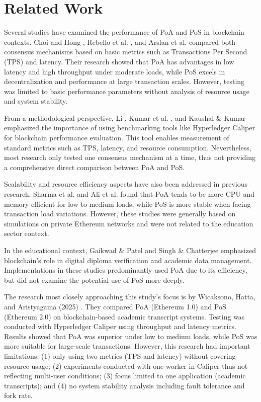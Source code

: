 \documentclass[conference]{IEEEtran}
\begin{document}
\section{Related Work}

Several studies have examined the performance of PoA and PoS in blockchain contexts. Choi and Hong \cite{choi2020}, Rebello et al. \cite{rebello2020}, and Arslan et al. \cite{arslan2020} compared both consensus mechanisms based on basic metrics such as Transactions Per Second (TPS) and latency. Their research showed that PoA has advantages in low latency and high throughput under moderate loads, while PoS excels in decentralization and performance at large transaction scales. However, testing was limited to basic performance parameters without analysis of resource usage and system stability.

From a methodological perspective, Li \cite{li2021}, Kumar et al. \cite{kumar2020}, and Kaushal \& Kumar \cite{kaushal2020} emphasized the importance of using benchmarking tools like Hyperledger Caliper for blockchain performance evaluation. This tool enables measurement of standard metrics such as TPS, latency, and resource consumption. Nevertheless, most research only tested one consensus mechanism at a time, thus not providing a comprehensive direct comparison between PoA and PoS.

Scalability and resource efficiency aspects have also been addressed in previous research. Sharma et al. \cite{sharma2020} and Ali et al. \cite{ali2020} found that PoA tends to be more CPU and memory efficient for low to medium loads, while PoS is more stable when facing transaction load variations. However, these studies were generally based on simulations on private Ethereum networks and were not related to the education sector context.

In the educational context, Gaikwad \& Patel \cite{gaikwad2019} and Singh \& Chatterjee \cite{singh2019} emphasized blockchain's role in digital diploma verification and academic data management. Implementations in these studies predominantly used PoA due to its efficiency, but did not examine the potential use of PoS more deeply.

The research most closely approaching this study's focus is by Wicaksono, Hatta, and Aristyagama (2025) \cite{wicaksono2025}. They compared PoA (Ethereum 1.0) and PoS (Ethereum 2.0) on blockchain-based academic transcript systems. Testing was conducted with Hyperledger Caliper using throughput and latency metrics. Results showed that PoA was superior under low to medium loads, while PoS was more suitable for large-scale transactions. However, this research had important limitations: (1) only using two metrics (TPS and latency) without covering resource usage; (2) experiments conducted with one worker in Caliper thus not reflecting multi-user conditions; (3) focus limited to one application (academic transcripts); and (4) no system stability analysis including fault tolerance and fork rate.
\end{document}
